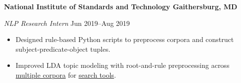 \textbf{National Institute of Standards and Technology \hfill Gaithersburg, MD}\par

\textit{NLP Research Intern} \hfill Jun 2019--Aug 2019
\begin{itemize}
	\item Designed rule-based Python scripts to preprocess corpora and construct subject-predicate-object tuples.
	\item Improved LDA topic modeling with root-and-rule preprocessing across \href{https://github.com/petezh/RR-NLP-Tools}{multiple corpora} for \href{https://randr.nist.gov/mgi/Default.aspx}{search tools}.
\end{itemize}\par